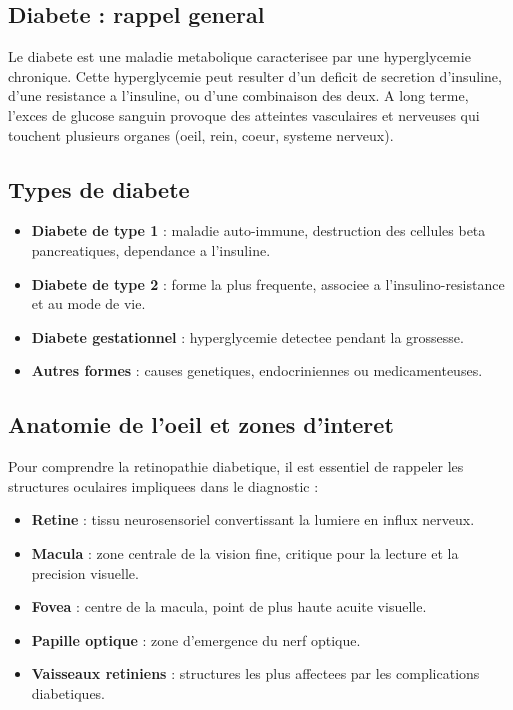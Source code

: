 \subsection{Diabete : rappel general}
Le diabete est une maladie metabolique caracterisee par une hyperglycemie chronique.
Cette hyperglycemie peut resulter d'un deficit de secretion d'insuline, d'une resistance a l'insuline,
ou d'une combinaison des deux. A long terme, l'exces de glucose sanguin provoque des atteintes vasculaires
et nerveuses qui touchent plusieurs organes (oeil, rein, coeur, systeme nerveux).

\subsection{Types de diabete}
\begin{itemize}
    \item \textbf{Diabete de type 1} : maladie auto-immune, destruction des cellules beta pancreatiques,
    dependance a l'insuline.
    \item \textbf{Diabete de type 2} : forme la plus frequente, associee a l'insulino-resistance et au mode de vie.
    \item \textbf{Diabete gestationnel} : hyperglycemie detectee pendant la grossesse.
    \item \textbf{Autres formes} : causes genetiques, endocriniennes ou medicamenteuses.
\end{itemize}

\subsection{Anatomie de l'oeil et zones d'interet}
Pour comprendre la retinopathie diabetique, il est essentiel de rappeler les structures oculaires impliquees
dans le diagnostic :
\begin{itemize}
    \item \textbf{Retine} : tissu neurosensoriel convertissant la lumiere en influx nerveux.
    \item \textbf{Macula} : zone centrale de la vision fine, critique pour la lecture et la precision visuelle.
    \item \textbf{Fovea} : centre de la macula, point de plus haute acuite visuelle.
    \item \textbf{Papille optique} : zone d'emergence du nerf optique.
    \item \textbf{Vaisseaux retiniens} : structures les plus affectees par les complications diabetiques.
\end{itemize}

